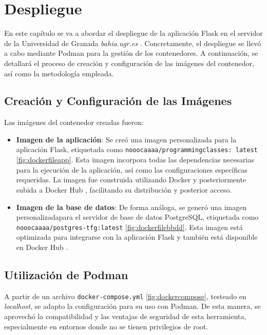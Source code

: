 \chapter{Despliegue} \label{chap:despliegue}

En este capítulo se va a abordar el despliegue de la aplicación Flask en el servidor de la Universidad de Granada \textit{bahia.ugr.es} \cite{bahia}. Concretamente, el despliegue se llevó a cabo mediante Podman \cite{podman} para la gestión de los contenedores. A continuación, se detallará el proceso de creación y configuración de las imágenes del contenedor, así como la metodología empleada.

\section{Creación y Configuración de las Imágenes}

Las imágenes del contenedor creadas fueron:

\begin{itemize}
    \item \textbf{Imagen de la aplicación}: Se creó una imagen personalizada para la aplicación Flask, etiquetada como \texttt{nooocaaaa/programmingclasses: latest} \ref{fig:dockerfileapp}. Esta imagen incorpora todas las dependencias necesarias para la ejecución de la aplicación, así como las configuraciones específicas requeridas. La imagen fue construida utilizando Docker y posteriormente subida a Docker Hub \cite{dockerhub}, facilitando su distribución y posterior acceso. 
    \item \textbf{Imagen de la base de datos}:  De forma análoga, se generó una imagen personalizadapara el servidor de base de datos PostgreSQL, etiquetada como \texttt{nooocaaaa/postgres-tfg:latest} \ref{fig:dockerfilebbdd}. Esta imagen está optimizada para integrarse con la aplicación Flask y también está disponible en Docker Hub \cite{dockerhub2}.
\end{itemize}

\section{Utilización de Podman}

A partir de un archivo \texttt{docker-compose.yml} \ref{fig:dockercompose}, testeado en \textit{localhost}, se adapto la configuración para su uso con Podman. De esta manera, se aprovechó la compatibilidad y las ventajas de seguridad de esta herramienta, especialmente en entornos donde no se tienen privilegios de root.

